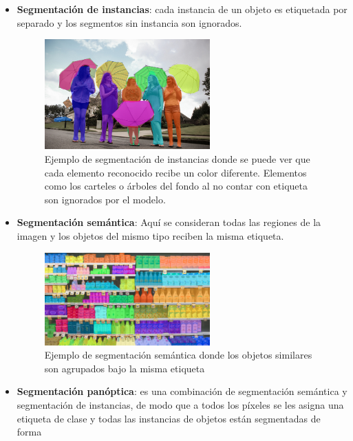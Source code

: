 \documentclass[letter,12pt]{report}
\begin{document}
\begin{itemize}
    \item \textbf{Segmentación de instancias}: cada instancia de un objeto es etiquetada por
        separado y los segmentos sin instancia son ignorados.
        \begin{figure}[H]
            \centering
            \includegraphics[width=0.6\textwidth]{segment3}
            \caption{Ejemplo de segmentación de instancias donde se puede ver que cada
                elemento reconocido recibe un color diferente. Elementos como los carteles
            o árboles del fondo al no contar con etiqueta son ignorados por el modelo.}
            \label{fig:segment3}
        \end{figure}
    \item \textbf{Segmentación semántica}: Aquí se consideran todas las regiones de la
        imagen y los objetos del mismo tipo reciben la misma etiqueta.
        \begin{figure}[H]
            \centering
            \includegraphics[width=0.6\textwidth]{segment2}
            \caption{Ejemplo de segmentación semántica donde los objetos similares son
            agrupados bajo la misma etiqueta}
            \label{fig:segment2}
        \end{figure}
    \item \textbf{Segmentación panóptica}: es una combinación de segmentación semántica y
        segmentación de instancias, de modo que a todos los píxeles se les asigna una
        etiqueta de clase y todas las instancias de objetos están segmentadas de forma

\end{itemize}
\end{document}
